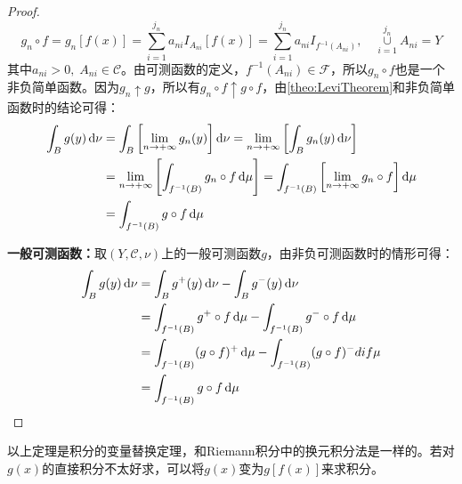 \begin{proof}
	\begin{equation*}
		g_n\circ f=g_n[f(x)]=\sum_{i=1}^{j_n}a_{ni}I_{A_{ni}}[f(x)]=\sum_{i=1}^{j_n}a_{ni}I_{f^{-1}(A_{ni})},\quad\underset{i=1}{\overset{j_n}{\cup}}A_{ni}=Y
	\end{equation*}
	其中$a_{ni}>0,\;A_{ni}\in\mathscr{C}$。由可测函数的定义，$f^{-1}(A_{ni})\in\mathscr{F}$，所以$g_n\circ f$也是一个非负简单函数。因为$g_n\uparrow g$，所以有$g_n\circ f\uparrow g\circ f$，由\cref{theo:LeviTheorem}和非负简单函数时的结论可得：
	\begin{align*}
		\int_{B}g(y)\mathop{}\!\mathrm{d}\nu&=\int_{B}\left[\lim_{n\to+\infty}g_n(y)\right]\mathop{}\!\mathrm{d}\nu
		=\lim_{n\to+\infty}\left[\int_{B}g_n(y)\mathop{}\!\mathrm{d}\nu\right] \\
		&=\lim_{n\to+\infty}\left[\int_{f^{-1}(B)}g_n\circ f\mathop{}\!\mathrm{d}\mu\right]
		=\int_{f^{-1}(B)}\left[\lim_{n\to+\infty}g_n\circ f\right]\mathop{}\!\mathrm{d}\mu \\
		&=\int_{f^{-1}(B)}g\circ f\mathop{}\!\mathrm{d}\mu
	\end{align*}\par
	\textbf{一般可测函数：}取$(Y,\mathscr{C},\nu)$上的一般可测函数$g$，由非负可测函数时的情形可得：
	\begin{align*}
		\int_{B}g(y)\mathop{}\!\mathrm{d}\nu&=\int_{B}g^+(y)\mathop{}\!\mathrm{d}\nu-\int_{B}g^-(y)\mathop{}\!\mathrm{d}\nu \\
		&=\int_{f^{-1}(B)}g^+\circ f\mathop{}\!\mathrm{d}\mu-\int_{f^{-1}(B)}g^-\circ f\mathop{}\!\mathrm{d}\mu \\
		&=\int_{f^{-1}(B)}(g\circ f)^+\mathop{}\!\mathrm{d}\mu-\int_{f^{-1}(B)}(g\circ f)^-dif\mu \\
		&=\int_{f^{-1}(B)}g\circ f\mathop{}\!\mathrm{d}\mu\qedhere
	\end{align*}
\end{proof}
\begin{note}
	以上定理是积分的变量替换定理，和Riemann积分中的换元积分法是一样的。若对$g(x)$的直接积分不太好求，可以将$g(x)$变为$g[f(x)]$来求积分。
\end{note}